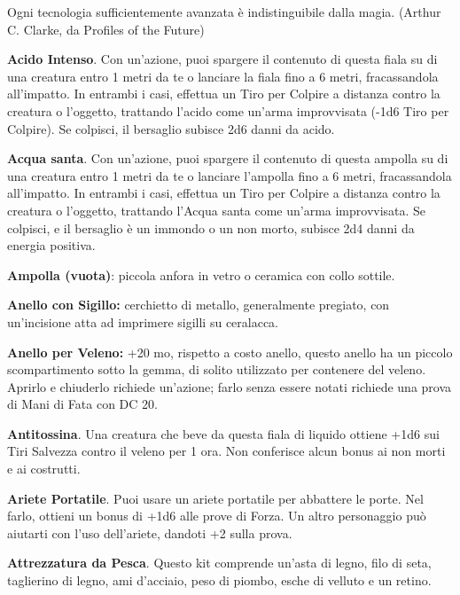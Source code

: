 \documentclass[12pt,a4paper,twoside,openany]{book}
\begin{document}
\begin{multicols}{2}
\begin{changemargin}{0.3cm}{0.3cm}\begin{enfasi}{
Ogni tecnologia sufficientemente avanzata è indistinguibile dalla magia. (Arthur C. Clarke, da Profiles of the Future)
}\end{enfasi}\end{changemargin}

\textbf{Acido Intenso}. Con un’azione, puoi spargere il contenuto di questa fiala su di una creatura entro 1 metri da te o lanciare la fiala fino a 6 metri, fracassandola all’impatto. In entrambi i casi, effettua un Tiro per Colpire a distanza contro la creatura o l’oggetto, trattando l’acido come un’arma improvvisata (-1d6 Tiro per Colpire). Se colpisci, il bersaglio subisce 2d6 danni da acido.

\textbf{Acqua santa}. Con un’azione, puoi spargere il contenuto di questa ampolla su di una creatura entro 1 metri da te o lanciare l’ampolla fino a 6 metri, fracassandola all’impatto. In entrambi i casi, effettua un Tiro per Colpire a distanza contro la creatura o l’oggetto, trattando l’Acqua santa come un’arma improvvisata. Se colpisci, e il bersaglio è un immondo o un non morto, subisce 2d4 danni da energia positiva.

\textbf{Ampolla (vuota)}: piccola anfora in vetro o ceramica con collo sottile.

\textbf{Anello con Sigillo:} cerchietto di metallo, generalmente pregiato, con un'incisione atta ad imprimere sigilli su ceralacca.

\textbf{Anello per Veleno:} +20 mo, rispetto a costo anello, questo anello ha un piccolo scompartimento sotto la gemma, di solito utilizzato per contenere del veleno. Aprirlo e chiuderlo richiede un'azione; farlo senza essere notati richiede una prova di Mani di Fata con DC 20.

\textbf{Antitossina}. Una creatura che beve da questa fiala di liquido ottiene +1d6 sui Tiri Salvezza contro il veleno per 1 ora. Non conferisce alcun bonus ai non morti e ai costrutti.

\textbf{Ariete Portatile}. Puoi usare un ariete portatile per abbattere le porte. Nel farlo, ottieni un bonus di +1d6 alle prove di Forza. Un altro personaggio può aiutarti con l’uso dell’ariete, dandoti +2 sulla prova.

\textbf{Attrezzatura da Pesca}. Questo kit comprende un’asta di legno, filo di seta, taglierino di legno, ami d’acciaio, peso di piombo, esche di velluto e un retino.


\end{multicols}
\end{document}
